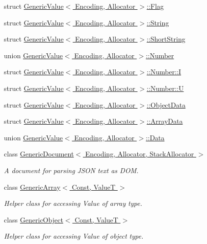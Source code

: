 \begin{DoxyCompactItemize}
struct \hyperlink{a00104}{Generic\+Value$<$ Encoding, Allocator $>$\+::\+Flag}
\item 
struct \hyperlink{a00291}{Generic\+Value$<$ Encoding, Allocator $>$\+::\+String}
\item 
struct \hyperlink{a00273}{Generic\+Value$<$ Encoding, Allocator $>$\+::\+Short\+String}
\item 
union \hyperlink{a00226}{Generic\+Value$<$ Encoding, Allocator $>$\+::\+Number}
\item 
struct \hyperlink{a00141}{Generic\+Value$<$ Encoding, Allocator $>$\+::\+Number\+::I}
\item 
struct \hyperlink{a00324}{Generic\+Value$<$ Encoding, Allocator $>$\+::\+Number\+::U}
\item 
struct \hyperlink{a00227}{Generic\+Value$<$ Encoding, Allocator $>$\+::\+Object\+Data}
\item 
struct \hyperlink{a00037}{Generic\+Value$<$ Encoding, Allocator $>$\+::\+Array\+Data}
\item 
union \hyperlink{a00071}{Generic\+Value$<$ Encoding, Allocator $>$\+::\+Data}
\item 
class \hyperlink{a00115}{Generic\+Document$<$ Encoding, Allocator, Stack\+Allocator $>$}
\begin{DoxyCompactList}\small\item\em A document for parsing J\+S\+ON text as D\+OM. \end{DoxyCompactList}\item 
class \hyperlink{a00114}{Generic\+Array$<$ Const, Value\+T $>$}
\begin{DoxyCompactList}\small\item\em Helper class for accessing Value of array type. \end{DoxyCompactList}\item 
class \hyperlink{a00120}{Generic\+Object$<$ Const, Value\+T $>$}
\begin{DoxyCompactList}\small\item\em Helper class for accessing Value of object type. \end{DoxyCompactList}\end{DoxyCompactItemize}

